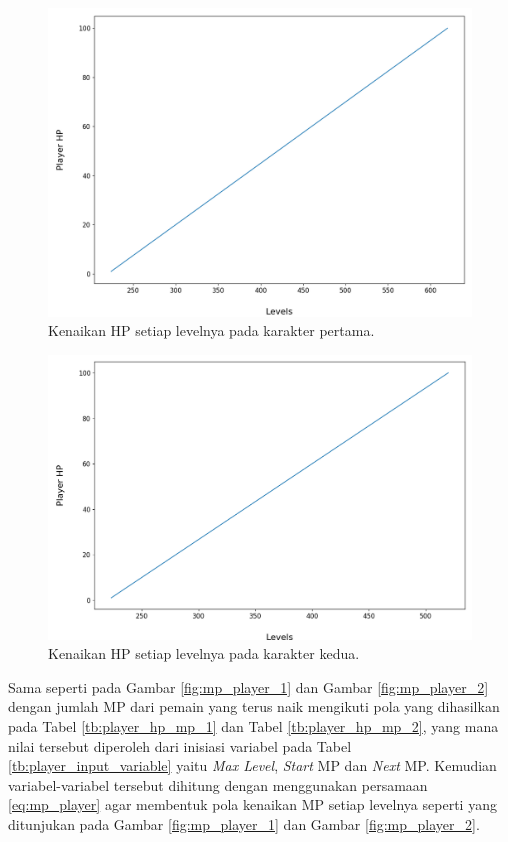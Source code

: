\begin{figure} [!h] \centering
	\includegraphics[scale=0.45]{img/PlayerHpDistrib1.png}
	\caption{Kenaikan HP setiap levelnya pada karakter pertama.}
	\label{fig:hp_player_1}
\end{figure}
\vspace{1ex}

\begin{figure} [!h] \centering
	\includegraphics[scale=0.45]{img/PlayerHpDistrib2.png}
	\caption{Kenaikan HP setiap levelnya pada karakter kedua.}
	\vspace{1ex}
	\label{fig:hp_player_2}
\end{figure}

Sama seperti pada Gambar \ref{fig:mp_player_1} dan Gambar \ref{fig:mp_player_2} dengan jumlah MP dari pemain yang terus naik mengikuti pola yang dihasilkan pada Tabel \ref{tb:player_hp_mp_1} dan Tabel \ref{tb:player_hp_mp_2}, yang mana nilai tersebut diperoleh dari inisiasi variabel pada Tabel \ref{tb:player_input_variable} yaitu \textit{Max Level}, \textit{Start} MP dan \textit{Next} MP. Kemudian variabel-variabel tersebut dihitung dengan menggunakan persamaan \ref{eq:mp_player} agar membentuk pola kenaikan MP setiap levelnya seperti yang ditunjukan pada Gambar \ref{fig:mp_player_1} dan Gambar \ref{fig:mp_player_2}. 
\vspace{1ex}

